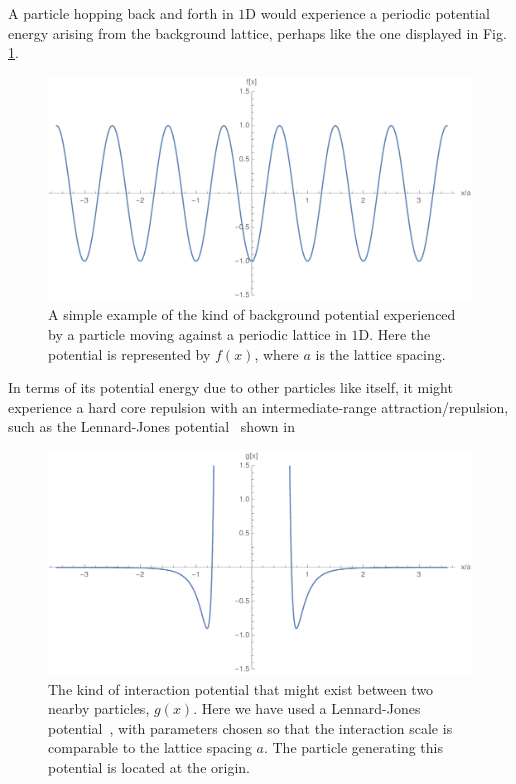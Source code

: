 A particle hopping back and forth in $1$D would experience a periodic potential energy arising from the 
background lattice, perhaps like the one displayed in Fig. \ref{fig:periodicPot}.
\begin{figure} \caption[An impression of the kind of background potential experienced by a particle moving
against a periodic lattice in $1$D.]{A simple example of the kind of background potential experienced by a 
particle moving against a periodic lattice in $1$D. Here the potential is represented by $f(x)$, where $a$
is the lattice spacing.} 
\label{fig:periodicPot}
\begin{center}
\includegraphics[width=1.0\textwidth]{intro/images/fPlot}
\end{center}
\end{figure}
In terms of its potential
energy due to other particles like itself, it might experience a hard core repulsion with an 
intermediate-range attraction/repulsion, such as the Lennard-Jones 
potential~\cite{atkins2011} shown in 
\begin{figure} \caption[The kind of interaction potential that might exist between two nearby particles.]{The kind of interaction potential that might exist between two nearby particles, $g(x)$. Here we have 
used a Lennard-Jones potential~\cite{atkins2011}, with parameters chosen so that the interaction scale is comparable to the
lattice spacing $a$. The particle generating this potential is located at the origin.} 
\label{fig:partInteraction}
\begin{center}
\includegraphics[width=1.0\textwidth]{intro/images/gPlot}
\end{center}
\end{figure}
